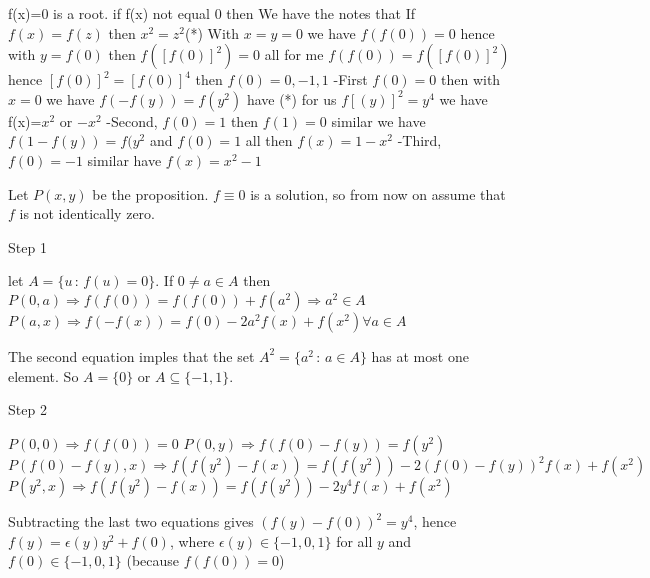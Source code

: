 \begin{solution}
	f(x)=0 is a root. if f(x) not equal 0 then
We have the  notes that
 If $f(x)=f(z)$ then $x^{2}=z^{2}$(*)
With $x=y=0$ we have $f(f(0))=0$
hence with $y=f(0)$ then $f([f(0)]^{2})=0$
all for me $f(f(0))=f([f(0)]^{2})$ hence $[f(0)]^{2}=[f(0)]^{4}$
then $f(0)=0,-1,1$
-First $f(0)=0$ then with $x=0$ we have $f(-f(y))=f(y^{2})$
have (*) for us $f[(y)]^{2}=y^{4}$
we have f(x)=$x^{2}$ or $-x^{2}$
-Second, $f(0)=1$ then $f(1)=0$ similar we have $f(1-f(y))=f(y^{2}$ and $f(0)=1$ all then
 $f(x)=1-x^{2}$
-Third,$ f(0)=-1$ similar have $f(x)=x^{2}-1$
\end{solution}



\begin{solution}
	Let $P(x,y)$ be the proposition. $f\equiv 0$ is a solution, so from now on assume that $f$ is not identically zero.

\begin{bolded}Step 1 \end{bolded} 
let $A = \{u \, : \, f(u) = 0\}$. If $0 \neq a \in A$ then
$P(0,a) \Rightarrow f(f(0))=f(f(0))+f(a^2) \Rightarrow a^2 \in A$
$P(a,x) \Rightarrow f(-f(x))=f(0)-2a^2f(x) + f(x^2) \forall a \in A$

The second equation imples that the set $A^2 = \{a^2 \, : \, a \in A\}$ has at most one element. So $A=\{0\}$ or $A\subseteq \{-1,1\}$.

\begin{bolded}Step 2\end{bolded}
$P(0,0) \Rightarrow  f(f(0))=0$
$P(0,y) \Rightarrow  f(f(0)-f(y)) = f(y^2)$
$P(f(0)-f(y),x) \Rightarrow f(f(y^2)-f(x)) = f(f(y^2)) - 2(f(0)-f(y))^2f(x) + f(x^2)$
$P(y^2,x) \Longrightarrow f(f(y^2)-f(x)) = f(f(y^2)) - 2y^4 f(x) + f(x^2)$

Subtracting the last two equations gives $(f(y)-f(0))^2 = y^4$, hence $f(y) = \epsilon(y)y^2 + f(0)$, where $\epsilon(y) \in \{-1,0,1\}$ for all $y$ and $f(0)\in \{-1,0,1\}$ (because $f(f(0))=0$)


\end{solution}
